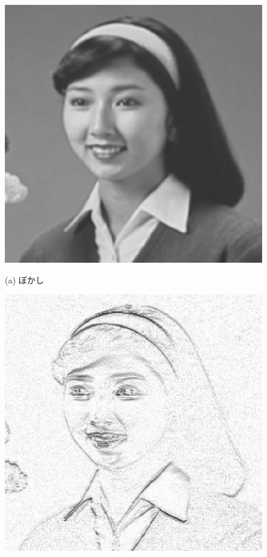 \begin{figure}[t]
\begin{center}
\begin{minipage}{.4\textwidth}
\begin{center}
\includegraphics[width=.95\textwidth]{fig/hair1_bokashi.eps}

(a) ぼかし
\end{center}
\end{minipage}
\begin{minipage}{.4\textwidth}
\begin{center}
\includegraphics[width=.95\textwidth]{fig/hair1_x_sharp.eps}


\end{center}
\end{minipage}
\end{center}
\end{figure}
